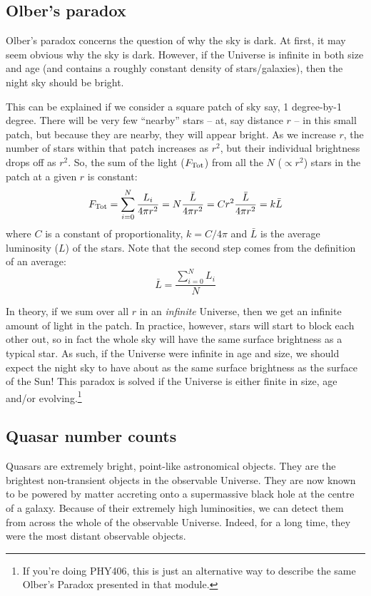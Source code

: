 \documentclass[11pt]{article}
\begin{document}
\subsection{Olber's paradox}
Olber's paradox concerns the question of why the sky is dark. At
first, it may seem obvious why the sky is dark. However, if the
Universe is infinite in both size and age (and contains a roughly
constant density of stars/galaxies), then the night sky should be
bright.

This can be explained if we consider a square patch of sky say, 1
degree-by-1 degree. There will be very few ``nearby'' stars -- at, say
distance $r$ -- in this small patch, but because they are nearby, they
will appear bright. As we increase $r$, the number of stars within
that patch increases as $r^2$, but their individual brightness drops
off as $r^2$. So, the sum of the light ($F_{\rm Tot}$) from all the
$N$ ($\propto r^2$) stars in the patch at a given $r$ is constant:
\begin{equation}
  F_{\rm Tot} = \sum_{i=0}^{N} \frac{L_i}{4\pi r^2} =
  N\frac{\bar{L}}{4\pi r^2} = Cr^2\frac{\bar{L}}{4\pi r^2} = k\bar{L}
\end{equation}
where $C$ is a constant of proportionality, $k = C/4\pi$ and $\bar{L}$
is the average luminosity ($L$) of the stars. Note that the second
step comes from the definition of an average:
\begin{equation}
  \bar{L} = \frac{\sum_{i=0}^{N} L_i}{N}
\end{equation}

In theory, if we sum over all $r$ in an {\it infinite} Universe, then we get an
infinite amount of light in the patch. In practice, however, stars will start to block each other out, so in fact the whole sky will have the same surface brightness as a typical star. As such, if the Universe were
infinite in age and size, we should expect the night sky to have about as the same surface brightness as the surface of the Sun! This paradox is solved if the Universe is either
finite in size, age and/or evolving.\footnote{If you're doing PHY406, this is just an alternative way to describe the same Olber's Paradox presented in that module.}

\subsection{Quasar number counts}
Quasars are extremely bright, point-like astronomical objects. They
are the brightest non-transient objects in the observable
Universe. They are now known to be powered by matter accreting onto a
supermassive black hole at the centre of a galaxy. Because of their
extremely high luminosities, we can detect them from across the whole
of the observable Universe. Indeed, for a long time, they were the
most distant observable objects.
\end{document}
